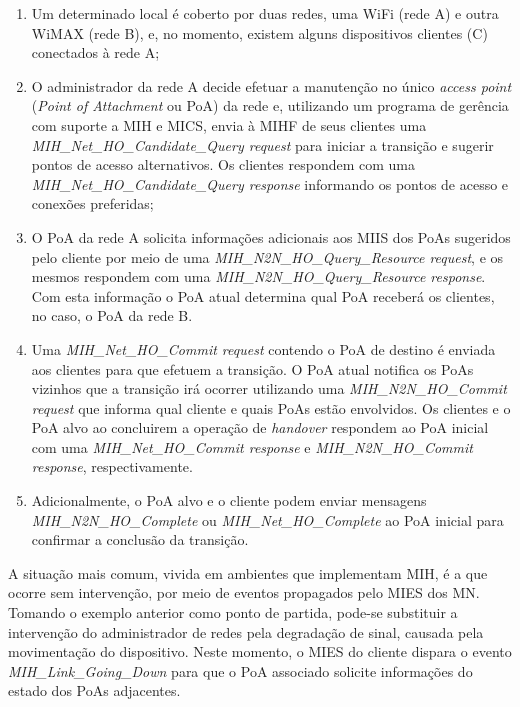 \documentclass[12pt]{article}
\begin{document}
\begin{enumerate}

	\item Um determinado local é coberto por duas redes, uma WiFi (rede A) 
	e outra WiMAX (rede B), e, no momento, existem alguns dispositivos 
	clientes (C) conectados à rede A;

	\item O administrador da rede A decide efetuar a manutenção no único 
	\textit{access point} (\textit{Point of Attachment} ou PoA) da rede e, 
	utilizando um programa de gerência com suporte a MIH e MICS, envia à 
	MIHF de seus clientes uma \textit{MIH\_Net\_HO\_Candidate\_Query 
	request} para iniciar a transição e sugerir pontos de acesso 
	alternativos. Os clientes respondem com uma 
	\textit{MIH\_Net\_HO\_Candidate\_Query response} informando os pontos 
	de acesso  e conexões preferidas;

	\item O PoA da rede A solicita informações adicionais aos MIIS dos 
	PoAs sugeridos pelo cliente por meio de uma 
	\textit{MIH\_N2N\_HO\_Query\_Resource request}, e os mesmos respondem 
	com uma \textit{MIH\_N2N\_HO\_Query\_Resource response}. Com esta 
	informação o PoA atual determina qual PoA receberá os clientes, no 
	caso, o PoA da rede B.

	\item Uma \textit{MIH\_Net\_HO\_Commit request} contendo o PoA de destino 
	é enviada aos clientes para que efetuem a transição. O PoA atual 
	notifica os PoAs vizinhos que a transição irá ocorrer utilizando uma 
	\textit{MIH\_N2N\_HO\_Commit request} que informa qual cliente e quais 
	PoAs estão envolvidos. Os clientes e o PoA alvo ao concluirem a 
	operação de \textit{handover} respondem ao PoA inicial com uma 
	\textit{MIH\_Net\_HO\_Commit response} e \textit{MIH\_N2N\_HO\_Commit 
	response}, respectivamente.

	\item Adicionalmente, o PoA alvo e o cliente podem enviar mensagens 
	\textit{MIH\_N2N\_HO\_Complete} ou \textit{MIH\_Net\_HO\_Complete} ao PoA 
	inicial para confirmar a conclusão da transição.

\end{enumerate}

A situação mais comum, vivida em ambientes que implementam MIH, é a que ocorre 
sem intervenção, por meio de eventos propagados pelo MIES dos MN. Tomando o 
exemplo anterior como ponto de partida, pode-se substituir a intervenção do 
administrador de redes pela degradação de sinal, causada pela movimentação do 
dispositivo. Neste momento, o MIES do cliente dispara o evento 
\textit{MIH\_Link\_Going\_Down} para que o PoA associado solicite informações 
do estado dos PoAs adjacentes.




\end{document}
